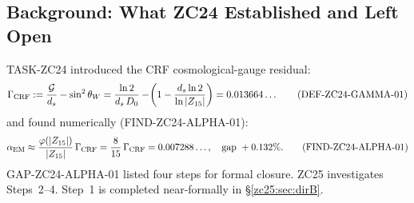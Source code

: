 \documentclass[12pt, a4paper]{article}
\begin{document}
\begin{abstract}
\sloppy
TASK-ZC24 established
$\alpha_{\rm EM} \approx (\varphi(15)/15)\,\Gamma_{\rm CRF}
= (8/15)\,\Gamma_{\rm CRF}$ at gap $+0.132\%$.
ZC25 investigates via two directions and a resolution-scale
analysis.

\textbf{Direction A:} Reverse-engineering from
$\alpha_{\rm EM}^{\rm meas}$ yields $D_0^{\rm needed} = 0.939956$,
differing from $D_0^{\rm can}$ by $-6.91\times10^{-5}$.
A systematic search finds no closed-form CRF expression
for this difference. Direction A closes formally.

\textbf{Direction B:} The argument for $8/15$ decomposes into B1
(uniform distribution, proved by THM-TC01) and B2 (EM-active $=
\mathbb{G}_{gen}$, near-formal from the coprimality condition).
The one missing link is CONJ-ZC25-B01: that $\Gamma_{\rm CRF}$
equals the total coupling rate distributed via the chi-map.
A force hierarchy $\alpha_i = (|S_i|/15)\,\Gamma_{\rm CRF}$
follows as a conditional prediction.

\textbf{R-layer analysis (v2):}
Applying DEF-RN02 ($R_0$, $R_1$, $R_{\max}$ framework) reveals
that all Z-Programme quantities --- $D_0$, $\mathcal{G}$,
$\cos^2\theta_W$, $w_{\rm DE}$, $\Gamma_{\rm CRF}$ --- are
$R_0$-layer (receiver-independent, pre-resolution) quantities.
The relation $\alpha_{\rm EM}^{R_0} = (8/15)\,\Gamma_{\rm CRF}$
is \emph{exact} at the $R_0$ layer. Gap $0.132\%$ is not a
derivation error but an $R_0\!\to\!R_{\max}$ crossing cost,
decomposable into a $\theta$-nonlinearity term
($-2.65\times10^{-5}$) and an $R_1$-wave shift
($+3.42\times10^{-5}$). The $R_1$-wave shift
$= 0.600\,\varepsilon_0^2$ is the precise target for ZC26.
\end{abstract}

\tableofcontents
\newpage

\subsection{Background: What ZC24 Established and Left Open}
\label{zc25:sec:background}

TASK-ZC24 introduced the CRF cosmological-gauge residual:
\begin{equation}
  \Gamma_{\rm CRF}
  := \frac{\mathcal{G}}{d_s} - \sin^2\theta_W
  = \frac{\ln 2}{d_s\,D_0} - \!\left(1 - \frac{d_s\ln 2}{\ln|Z_{15}|}\right)
  = 0.013664\ldots
  \tag{DEF-ZC24-GAMMA-01}\label{zc25:eq:gamma}
\end{equation}
and found numerically (FIND-ZC24-ALPHA-01):
\begin{equation}
  \alpha_{\rm EM} \approx \frac{\varphi(|Z_{15}|)}{|Z_{15}|}\,\Gamma_{\rm CRF}
  = \frac{8}{15}\,\Gamma_{\rm CRF}
  = 0.007288\ldots,
  \quad \text{gap }+0.132\%.
  \tag{FIND-ZC24-ALPHA-01}\label{zc25:eq:alpha-find}
\end{equation}
GAP-ZC24-ALPHA-01 listed four steps for formal closure.
ZC25 investigates Steps~2--4. Step~1 is completed
near-formally in \S\ref{zc25:sec:dirB}.
\end{document}

